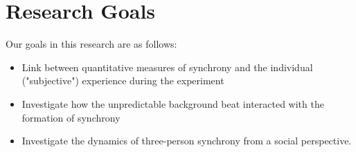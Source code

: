\documentclass[a4paper, 11pt]{article}      %
\begin{document}
\section{Research Goals}
Our goals in this research are as follows: 
\begin{itemize}
\item Link between quantitative measures of synchrony and the individual ("subjective") experience during the experiment
\item Investigate how the unpredictable background beat interacted with the formation of synchrony
\item Investigate the dynamics of three-person synchrony from a social perspective.
\end{itemize}
\end{document}
